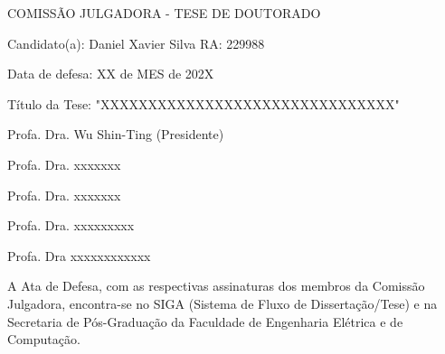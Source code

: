 \documentclass[
    12pt,                %
    oneside,            %
    a4paper,            %
    english,            %
    french,                %
    spanish,            %
    brazil                %
    ]{abntex2}
\begin{document}
    
    
    


% 
%

%
% 
%
\begin{folhadeaprovacao}

  \begin{center}
    COMISS\~{A}O JULGADORA - TESE DE DOUTORADO
\end{center}
\noindent
\begin{minipage}{\textwidth}\SingleSpacing
Candidato(a): Daniel Xavier Silva     RA: 229988

Data de defesa: XX de MES de 202X

T\'{i}tulo da Tese: "XXXXXXXXXXXXXXXXXXXXXXXXXXXXXXX"
\vspace{2cm}

Profa. Dra. Wu Shin-Ting (Presidente)

Profa. Dra. xxxxxxx

Profa. Dra. xxxxxxx

Profa. Dra. xxxxxxxxx

Profa. Dra xxxxxxxxxxxx

\vspace{2cm}

A Ata de Defesa, com as respectivas assinaturas dos membros da Comissão Julgadora, encontra-se no SIGA (Sistema de Fluxo de Dissertação/Tese) e na Secretaria de Pós-Graduação da Faculdade de Engenharia Elétrica e de Computação.
\end{minipage}

\end{folhadeaprovacao}
\end{document}
